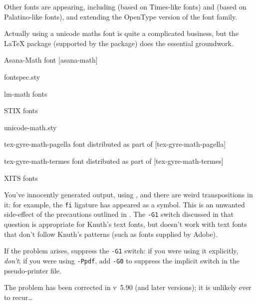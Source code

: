 Other fonts are appearing, including %
 (based on Times-like fonts) and
 (based on Palatino-like fonts),
and  extending the OpenType version of the
 font family.

Actually using a unicode maths font is quite a complicated business,
but the \LaTeX{} package  (supported
by the  package) does the essential groundwork.
\begin{ctanrefs}
\item[Asana-Math \nothtml{\rmfamily}font][asana-math]
\item[fontspec.sty]
\item[lm-math \nothtml{\rmfamily}fonts]
\item[STIX \nothtml{\rmfamily}fonts]
\item[unicode-math.sty]
\item[tex-gyre-math-pagella \nothtml{\rmfamily}font]distributed as
  part of [tex-gyre-math-pagella]
\item[tex-gyre-math-termes \nothtml{\rmfamily}font]distributed as part
  of [tex-gyre-math-termes]
\item[XITS \nothtml{\rmfamily}fonts]
\end{ctanrefs}


You've innocently generated output, using , and there
are weird transpositions in it: for example, the \texttt{fi} ligature has
appeared as a \textsterling{} symbol.
This is an unwanted side-effect of the precautions
outlined in .
The \texttt{-G1} switch discussed in that question is appropriate for
Knuth's text fonts, but doesn't work with text fonts that don't follow
Knuth's patterns (such as fonts supplied by Adobe).

If the problem arises, suppress the \texttt{-G1} switch: if you were using it
explicitly, \emph{don't}; if you were using \texttt{-Ppdf}, add \texttt{-G0} to
suppress the implicit switch in the pseudo-printer file.

The problem has been corrected in  v~5.90 (and later
versions); it is unlikely ever to recur\dots{}

